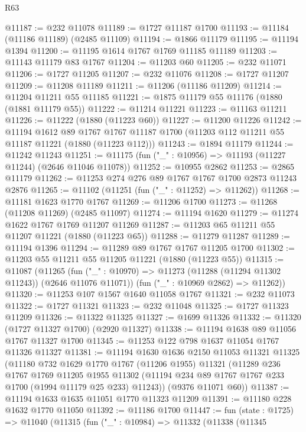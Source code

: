 \begin{lexlean}{R63}
\begin{coremodule}
@11187 := @232 @11078
@11189 := @1727 @11187 @1700
@11193 := @11184 (@11186 @11189) (@2485 @11109)
@11194 := @1866 @11179
@11195 := @11194 @1394
@11200 := @11195 @1614 @1767 @1769 @11185 @11189
@11203 := @11143 @11179 @83 @1767
@11204 := @11203 @60
@11205 := @232 @11071
@11206 := @1727 @11205
@11207 := @232 @11076
@11208 := @1727 @11207
@11209 := @11208 @11189
@11211 := @11206 (@11186 @11209)
@11214 := @11204 @11211 @55 @11185
@11221 := @1875 @11179 @55 @11176 (@1880 (@1881 @11179 @55))
@11222 := @11214 @11221
@11223 := @11163 @11211
@11226 := @11222 (@1880 (@11223 @60))
@11227 := @11200 @11226
@11242 := @11194
    @1612
    @89
    @1767
    @1767
    @11187
    @1700
    (@11203 @112 @11211 @55 @11187 @11221 (@1880 (@11223 @112)))
@11243 := @1894 @11179
@11244 := @11242 @11243
@11251 := @11175 (fun ("_" : @10956) => @11193 (@11227 @11244) (@2646 @11046 @11078))
@11252 := @10955 @2862
@11253 := @2865 @11179
@11262 := @11253 @274 @276 @89 @1767 @1767 @1700 @2873 @11243 @2876
@11265 := @11102 (@11251 (fun ("_" : @11252) => @11262))
@11268 := @11181 @1623 @1770 @1767
@11269 := @11206 @1700
@11273 := @11268 (@11208 @11269) (@2485 @11097)
@11274 := @11194 @1620
@11279 := @11274 @1622 @1767 @1769 @11207 @11269
@11287 := @11203 @65 @11211 @55 @11207 @11221 (@1880 (@11223 @65))
@11288 := @11279 @11287
@11289 := @11194 @1396
@11294 := @11289 @89 @1767 @1767 @11205 @1700
@11302 := @11203 @55 @11211 @55 @11205 @11221 (@1880 (@11223 @55))
@11315 := @11087
    (@11265
      (fun ("_" : @10970) => @11273 (@11288 (@11294 @11302 @11243)) (@2646 @11076 @11071))
      (fun ("_" : @10969 @2862) => @11262))
@11320 := @11253 @107 @1567 @1640 @11058 @1767
@11321 := @232 @11073
@11322 := @1727 @11321
@11323 := @232 @11048
@11325 := @1727 @11323 @11209
@11326 := @11322 @11325
@11327 := @1699 @11326
@11332 := @11320 (@1727 @11327 @1700) (@2920 @11327)
@11338 := @11194 @1638 @89 @11056 @1767 @11327 @1700
@11345 := @11253 @122 @798 @1637 @11054 @1767 @11326 @11327
@11381 := @11194
    @1630
    @1636
    @2150
    @11053
    @11321
    @11325
    (@11180
      @732
      @1629
      @1770
      @1767
      (@11206 @1955)
      @11321
      (@11289
        @236
        @1767
        @1769
        @11205
        @1955
        @11302
        (@11194 @234 @89 @1767 @1767 @233 @1700 (@1994 @11179 @25 @233) @11243))
      (@9376 @11071 @60))
@11387 := @11194 @1633 @1635 @11051 @1770 @11323 @11209
@11391 := @11180 @228 @1632 @1770 @11050
@11392 := @11186 @1700
@11447 := fun (state : @1725) =>
  @11040
    (@11315
      (fun ("_" : @10984) =>
      @11332
        (@11338
          (@11345

\end{coremodule}
\end{lexlean}
